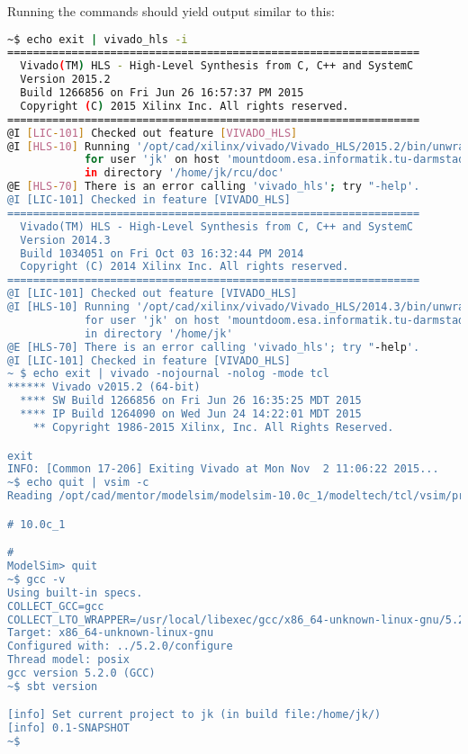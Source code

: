 Running the commands should yield output similar to this:
\begin{lstlisting}[language=bash, breaklines=true]
~$ echo exit | vivado_hls -i
================================================================
  Vivado(TM) HLS - High-Level Synthesis from C, C++ and SystemC
  Version 2015.2
  Build 1266856 on Fri Jun 26 16:57:37 PM 2015
  Copyright (C) 2015 Xilinx Inc. All rights reserved.
================================================================
@I [LIC-101] Checked out feature [VIVADO_HLS]
@I [HLS-10] Running '/opt/cad/xilinx/vivado/Vivado_HLS/2015.2/bin/unwrapped/lnx64.o/vivado_hls'
            for user 'jk' on host 'mountdoom.esa.informatik.tu-darmstadt.de' (Linux_x86_64 version 3.19.5-100.fc20.x86_64) on Mon Nov 02 11:05:24 CET 2015
            in directory '/home/jk/rcu/doc'
@E [HLS-70] There is an error calling 'vivado_hls'; try "-help'.
@I [LIC-101] Checked in feature [VIVADO_HLS]
================================================================
  Vivado(TM) HLS - High-Level Synthesis from C, C++ and SystemC
  Version 2014.3
  Build 1034051 on Fri Oct 03 16:32:44 PM 2014
  Copyright (C) 2014 Xilinx Inc. All rights reserved.
================================================================
@I [LIC-101] Checked out feature [VIVADO_HLS]
@I [HLS-10] Running '/opt/cad/xilinx/vivado/Vivado_HLS/2014.3/bin/unwrapped/lnx64.o/vivado_hls'
            for user 'jk' on host 'mountdoom.esa.informatik.tu-darmstadt.de' (Linux_x86_64 version 3.17.8-200.fc20.x86_64) on Tue Feb 10 17:28:49 CET 2015
            in directory '/home/jk'
@E [HLS-70] There is an error calling 'vivado_hls'; try "-help'.
@I [LIC-101] Checked in feature [VIVADO_HLS]
~ $ echo exit | vivado -nojournal -nolog -mode tcl 
****** Vivado v2015.2 (64-bit)
  **** SW Build 1266856 on Fri Jun 26 16:35:25 MDT 2015
  **** IP Build 1264090 on Wed Jun 24 14:22:01 MDT 2015
    ** Copyright 1986-2015 Xilinx, Inc. All Rights Reserved.

exit
INFO: [Common 17-206] Exiting Vivado at Mon Nov  2 11:06:22 2015...
~$ echo quit | vsim -c
Reading /opt/cad/mentor/modelsim/modelsim-10.0c_1/modeltech/tcl/vsim/pref.tcl 

# 10.0c_1

#  
ModelSim> quit
~$ gcc -v
Using built-in specs.
COLLECT_GCC=gcc
COLLECT_LTO_WRAPPER=/usr/local/libexec/gcc/x86_64-unknown-linux-gnu/5.2.0/lto-wrapper
Target: x86_64-unknown-linux-gnu
Configured with: ../5.2.0/configure
Thread model: posix
gcc version 5.2.0 (GCC)
~$ sbt version

[info] Set current project to jk (in build file:/home/jk/)
[info] 0.1-SNAPSHOT
~$
\end{lstlisting}



